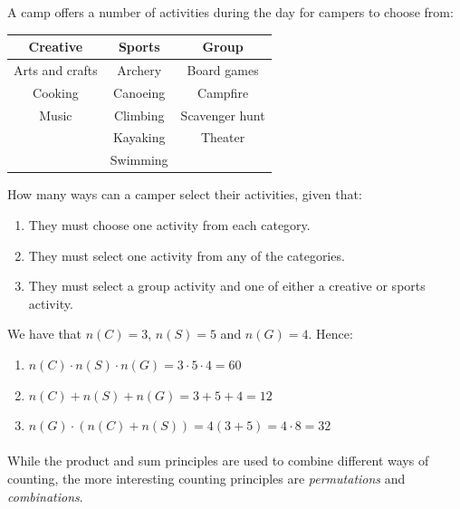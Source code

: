 \documentclass[12pt, a4paper, titlepage, twoside]{article}
\newcounter{excount}[subsection]
\begin{document}
	\newpage	
	
	\begin{ex}
		A camp offers a number of activities during the day for campers to choose from:
		
		\begin{longtable}{|c|c|c|}
			\hline
			\textbf{Creative} & \textbf{Sports} & \textbf{Group}\\
			\hline
			Arts and crafts & Archery & Board games\\
			\hline
			Cooking & Canoeing & Campfire\\
			\hline
			Music & Climbing & Scavenger hunt\\
			\hline
			\makecell{} & Kayaking & Theater\\
			\hline
			\makecell{} & Swimming & \makecell{}\\
			\hline
		\end{longtable}
		
		How many ways can a camper select their activities, given that:
		
		\begin{enumerate}[label=\textbf{(\alph*)}]
			\item They must choose one activity from each category.
			\item They must select one activity from any of the categories.
			\item They must select a group activity and one of either a creative or sports activity.
		\end{enumerate}
		
		\tcbline
		\hfill
		
		We have that $n(C) = 3$, $n(S) = 5$ and $n(G) = 4$. Hence:\\
		
		\begin{enumerate}[label=\textbf{(\alph*)}]
			\item $n(C) \cdot n(S) \cdot n(G) = 3 \cdot 5 \cdot 4 = 60$
			\item $n(C) + n(S) + n(G) = 3 + 5 + 4 = 12$
			\item $n(G) \cdot (n(C) + n(S)) = 4(3 + 5) = 4 \cdot 8 = 32$
		\end{enumerate}
	\end{ex}
	
	\paragraph{}
	While the product and sum principles are used to combine different ways of counting, the more interesting counting 
	principles are \textit{permutations} and \textit{combinations}. 
	
\end{document}
